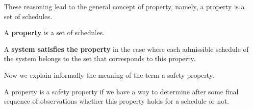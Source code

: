 These reasoning lead to the general concept of property, namely, a property is a set of schedules.
\begin{assumption}
A {\bfseries property} is a set of schedules.
\end{assumption}
\begin{assumption}
A {\bfseries system satisfies the property} in the case where each admissible schedule of the system belongs to the set that corresponds to this property.
\end{assumption}
Now we explain informally the meaning of the term a safety property.
\begin{assumption}
A property is a safety property if we have a way to determine after some final sequence of observations whether this property holds for a schedule or not.
\end{assumption}


